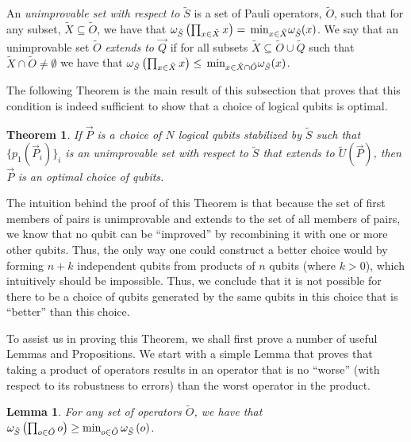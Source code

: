 \documentclass[twocolumn,showpacs,preprintnumbers,amsmath,amssymb,nofootinbib,pra,floatfix]{revtex4-1}
\newtheorem{theorem}{Theorem}
\newtheorem{lemma}{Lemma}
\newenvironment{definition}[1][Definition]{\begin{trivlist}
\item[\hskip \labelsep {\bfseries #1}]}{\end{trivlist}}
\newenvironment{remark}[1][Remark]{\begin{trivlist}
\item[\hskip \labelsep {\bfseries #1}]}{\end{trivlist}}
\newcommand{\lst}{\vec}
\newcommand{\set}{\tilde}
\begin{document}
\begin{definition}
An \emph{unimprovable set with respect to $\set S$} is a set of Pauli operators, $\set O$, such that for any subset, $\set X\subseteq \set O$, we have that $\om_{\set S}\paren{\prod_{x\in \set X} x} = \min_{x\in\set X}\om_{\set S}(x)$.  We say that an unimprovable set $\set O$ \emph{extends to $\lst Q$} if for all subsets $\set X \subseteq \set O\cup\set Q$ such that $\set X\cap \set O \ne \emptyset$ we have that $\om_{\set S}\paren{\prod_{x\in \set X} x} \le \min_{x\in\set X\cap \set O}\om_{\set S}(x)$.
\end{definition}
The following Theorem is the main result of this subsection that proves that this condition is indeed sufficient to show that a choice of logical qubits is optimal.

\begin{theorem}
\label{theorem:optimality-condition}
If $\lst P$ is a choice of $N$ logical qubits stabilized by $\set S$ such that $\{p_1(\lst P_i)\}_i$ is an unimprovable set with respect to $\set S$ that extends to $\set U(\lst P)$, then $\lst P$ is an optimal choice of qubits.
\end{theorem}

\begin{remark}
The intuition behind the proof of this Theorem is that because the set of first members of pairs is unimprovable and extends to the set of all members of pairs, we know that no qubit can be ``improved'' by recombining it with one or more other qubits.  Thus, the only way one could construct a better choice would by forming $n+k$ independent qubits from products of $n$ qubits (where $k>0$), which intuitively should be impossible.  Thus, we conclude that it is not possible for there to be a choice of qubits generated by the same qubits in this choice that is ``better'' than this choice.

To assist us in proving this Theorem, we shall first prove a number of useful Lemmas and Propositions.  We start with a simple Lemma that proves that taking a product of operators results in an operator that is no ``worse'' (with respect to its robustness to errors) than the worst operator in the product.
\end{remark}
\begin{lemma}
\label{combinations-can't-make-things-worse}
For any set of operators $\set O$, we have that $\om_{\set S}\paren{\prod_{o\in\set O} o} \ge \text{min}_{o\in \set O}\,\om_{\set S}\paren{o}$.
\end{lemma}
\end{document}

